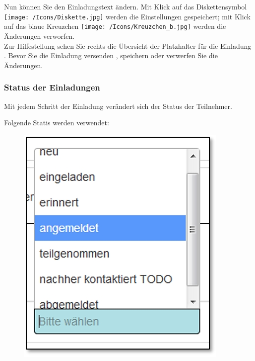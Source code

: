 Nun können Sie den Einladungstext  ändern. Mit Klick auf das Diskettensymbol \texttt{[image: /Icons/Diskette.jpg]}  werden die Einstellungen gespeichert; mit Klick auf das blaue Kreuzchen \texttt{[image: /Icons/Kreuzchen\_b.jpg]}  werden die Änderungen verworfen.\\
Zur Hilfestellung sehen Sie rechts die Übersicht der Platzhalter für die Einladung . Bevor Sie die Einladung versenden , speichern  oder verwerfen  Sie die Änderungen.

\subsubsection{Status der Einladungen}

Mit jedem Schritt der Einladung verändert sich der Status der Teilnehmer.

Folgende Statis werden verwendet:

\begin{figure}   %
  \vspace{-10pt}      %
  \begin{center}
    \includegraphics[width=.8\linewidth]{../chapters/10_CRM/pictures/10-2-5_Status.jpg}
  \end{center}
  \vspace{-20pt}
  \vspace{-10pt}
\end{figure}


